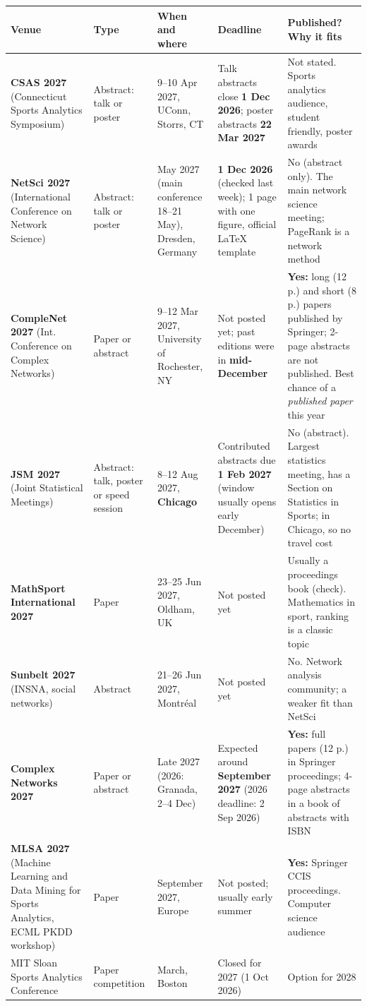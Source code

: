 \documentclass[10pt]{article}
\begin{document}
\begin{center}\small
\begin{tabularx}{\textwidth}{@{}P{3.0cm}P{1.6cm}P{3.0cm}P{3.3cm}L@{}}
\toprule
Venue & Type & When and where & Deadline & Published? Why it fits \\
\midrule
\textbf{CSAS 2027} (Connecticut Sports Analytics Symposium) & Abstract: talk or poster & 9--10 Apr 2027, UConn, Storrs, CT & Talk abstracts close \textbf{1 Dec 2026}; poster abstracts \textbf{22 Mar 2027} & Not stated. Sports analytics audience, student friendly, poster awards \\
\addlinespace
\textbf{NetSci 2027} (International Conference on Network Science) & Abstract: talk or poster & May 2027 (main conference 18--21 May), Dresden, Germany & \textbf{1 Dec 2026} (checked last week); 1 page with one figure, official LaTeX template & No (abstract only). The main network science meeting; PageRank is a network method \\
\addlinespace
\textbf{CompleNet 2027} (Int. Conference on Complex Networks) & Paper or abstract & 9--12 Mar 2027, University of Rochester, NY & Not posted yet; past editions were in \textbf{mid-December} & \textbf{Yes:} long (12 p.) and short (8 p.) papers published by Springer; 2-page abstracts are not published. Best chance of a \emph{published paper} this year \\
\addlinespace
\textbf{JSM 2027} (Joint Statistical Meetings) & Abstract: talk, poster or speed session & 8--12 Aug 2027, \textbf{Chicago} & Contributed abstracts due \textbf{1 Feb 2027} (window usually opens early December) & No (abstract). Largest statistics meeting, has a Section on Statistics in Sports; in Chicago, so no travel cost \\
\addlinespace
\textbf{MathSport International 2027} & Paper & 23--25 Jun 2027, Oldham, UK & Not posted yet & Usually a proceedings book (check). Mathematics in sport, ranking is a classic topic \\
\addlinespace
\textbf{Sunbelt 2027} (INSNA, social networks) & Abstract & 21--26 Jun 2027, Montr\'eal & Not posted yet & No. Network analysis community; a weaker fit than NetSci \\
\addlinespace
\textbf{Complex Networks 2027} & Paper or abstract & Late 2027 (2026: Granada, 2--4 Dec) & Expected around \textbf{September 2027} (2026 deadline: 2 Sep 2026) & \textbf{Yes:} full papers (12 p.) in Springer proceedings; 4-page abstracts in a book of abstracts with ISBN \\
\addlinespace
\textbf{MLSA 2027} (Machine Learning and Data Mining for Sports Analytics, ECML PKDD workshop) & Paper & September 2027, Europe & Not posted; usually early summer & \textbf{Yes:} Springer CCIS proceedings. Computer science audience \\
\addlinespace
MIT Sloan Sports Analytics Conference & Paper competition & March, Boston & Closed for 2027 (1 Oct 2026) & Option for 2028 \\
\bottomrule
\end{tabularx}
\end{center}
\end{document}
